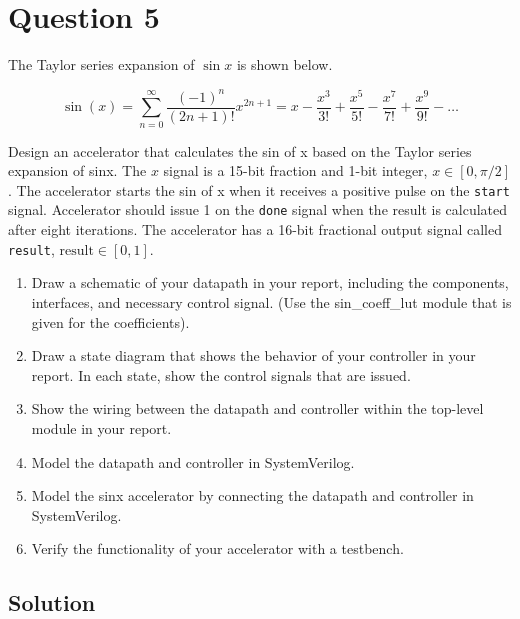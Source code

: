 \documentclass[../main.tex]{subfiles}
\begin{document}
\newpage

\section{Question 5}

The Taylor series expansion of $\sin x$ is shown below.

$$
    \sin(x) = \sum_{n = 0}^\infty \frac{(-1)^n}{(2n+1)!} x^{2n + 1} = x - \frac{x^3}{3!} + \frac{x^5}{5!} - \frac{x^7}{7!} + \frac{x^9}{9!} - \ldots
$$

Design an accelerator that calculates the sin of x based on the Taylor series expansion of sinx. The $x$ signal is a 15-bit fraction and 1-bit integer, $x \in [0, \pi/2]$. The accelerator starts the sin of x when it receives a positive pulse on the \lstinline{start} signal. Accelerator should issue 1 on the \lstinline{done} signal when the result is calculated after eight iterations. The accelerator has a 16-bit fractional output signal called \lstinline{result}, $\text{result} \in [0, 1]$.

\begin{enumerate}
    \item Draw a schematic of your datapath in your report, including the components, interfaces, and necessary control signal. (Use the sin_coeff_lut module that is given for the coefficients).
    \item Draw a state diagram that shows the behavior of your controller in your report. In each state, show the control signals that are issued.
    \item Show the wiring between the datapath and controller within the top-level module in your report.
    \item Model the datapath and controller in SystemVerilog.
    \item Model the sinx accelerator by connecting the datapath and controller in SystemVerilog.
    \item Verify the functionality of your accelerator with a testbench.
\end{enumerate}

\subsection*{Solution}
\end{document}
